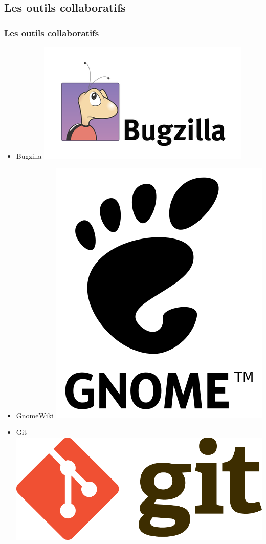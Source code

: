 \documentclass{beamer}
\begin{document}
\subsection{Les outils collaboratifs}
\begin{frame}
  \frametitle{Les outils collaboratifs}
  \begin{itemize}
  \item Bugzilla
    \includegraphics[scale=0.1]{images/bugzilla-logo.png}
  \item GnomeWiki
    \includegraphics[scale=0.04]{images/gnome-logo.png}
  \item Git
    \includegraphics[scale=0.03]{images/git-logo.png}

\end{itemize}
\end{frame}
\end{document}
